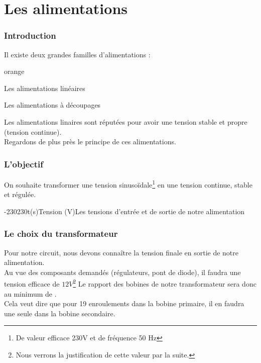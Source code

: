  
\part{Les alimentations}
\section{Introduction}


Il existe deux grandes familles d'alimentations : 

\begin{items}{orange}{\Triangle}
    \item Les alimentations linéaires
    \item Les alimentations à découpages
\end{items}

Les alimentations linaires sont réputées pour avoir une tension stable et propre (tension continue).\\
Regardons de plus près le principe de ces alimentations.

\section{L'objectif}

On souhaite transformer une tension sinusoïdale\footnote{De valeur efficace 230V et de fréquence 50 Hz} en une tension continue, stable et régulée.

\vfill
\begin{graphicFigure}{0.8}{1}{0}{0.08}{-230}{230}{t(s)}{Tension (V)}{Les tensions d'entrée et de sortie de notre alimentation}
  \end{graphicFigure}

  \newpage
  \section{Le choix du transformateur}

  Pour notre circuit, nous devons connaître la tension finale en sortie de notre alimentation.\\
  Au vue des composants demandés (régulateurs, pont de diode), il faudra une tension efficace de $12V$\footnote{Nous verrons la justification de cette valeur par la suite.}
  Le rapport des bobines de notre transformateur sera donc au minimum de . \\Cela veut dire que pour 19 enroulements dans la bobine primaire, il en faudra une seule dans la bobine secondaire.


